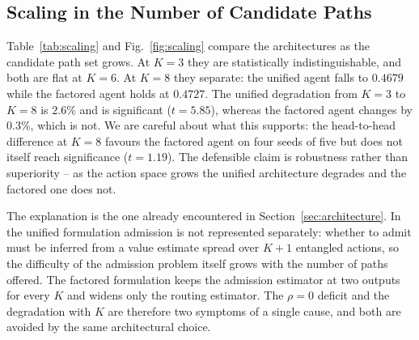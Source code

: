\documentclass[10pt,journal,comsoc]{IEEEtran}
\begin{document}
\subsection{Scaling in the Number of Candidate Paths}
\label{sec:scaling}
Table~\ref{tab:scaling} and Fig.~\ref{fig:scaling} compare the
architectures as the candidate path set grows. At $K=3$ they are
statistically indistinguishable, and both are flat at $K=6$. At $K=8$ they
separate: the unified agent falls to $0.4679$ while the factored agent
holds at $0.4727$. The unified degradation from $K=3$ to $K=8$ is $2.6\%$
and is significant ($t=5.85$), whereas the factored agent changes by
$0.3\%$, which is not. We are careful about what this supports: the
head-to-head difference at $K=8$ favours the factored agent on four seeds
of five but does not itself reach significance ($t=1.19$). The defensible
claim is robustness rather than superiority -- as the action space grows
the unified architecture degrades and the factored one does not.

The explanation is the one already encountered in
Section~\ref{sec:architecture}. In the unified formulation admission is
not represented separately: whether to admit must be inferred from a value
estimate spread over $K+1$ entangled actions, so the difficulty of the
admission problem itself grows with the number of paths offered. The
factored formulation keeps the admission estimator at two outputs for
every $K$ and widens only the routing estimator. The $\rho=0$ deficit and
the degradation with $K$ are therefore two symptoms of a single cause, and
both are avoided by the same architectural choice.
\end{document}
